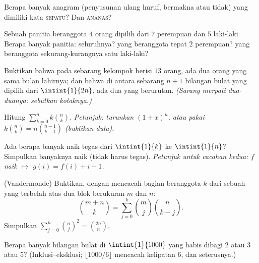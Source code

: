 \begin{exercise}[$\star$]\label{exo:b1:counting:2}
Berapa banyak anagram (penyusunan ulang huruf, bermakna atau tidak)
yang dimiliki kata \textsc{sepatu}? Dan \textsc{ananas}?
\end{exercise}

\begin{exercise}[$\star$]\label{exo:b1:counting:3}
Sebuah panitia beranggota $4$ orang dipilih dari $7$ perempuan dan $5$
laki-laki. Berapa banyak panitia: seluruhnya? yang beranggota tepat $2$
perempuan? yang beranggota sekurang-kurangnya satu laki-laki?
\end{exercise}

\begin{exercise}[$\star$]\label{exo:b1:counting:4}
Buktikan bahwa pada sebarang kelompok berisi $13$ orang, ada dua orang yang sama bulan lahirnya;
dan bahwa di antara sebarang $n + 1$ bilangan bulat yang dipilih dari $\intint{1}{2n}$, ada dua yang berurutan. \emph{(Sarang merpati dua-duanya: sebutkan
kotaknya.)}
\end{exercise}

\begin{exercise}[$\star$]\label{exo:b1:counting:5}
Hitung $\sum_{k=0}^{n} k \binom{n}{k}$. \emph{Petunjuk: turunkan
$(1 + x)^n$, atau pakai $k \binom nk = n \binom{n-1}{k-1}$ (buktikan dulu).}
\end{exercise}

\begin{exercise}[$\star\star$]\label{exo:b1:counting:6}
Ada berapa banyak  naik tegas dari $\intint{1}{k}$ ke $\intint{1}{n}$? Simpulkan banyaknya 
naik (tidak harus tegas). \emph{Petunjuk untuk cacahan kedua:
$f$ naik $\mapsto$ $g(i) = f(i) + i - 1$.}
\end{exercise}

\begin{exercise}[$\star\star$]\label{exo:b1:counting:7}
(Vandermonde) Buktikan, dengan mencacah  bagian beranggota $k$ dari sebuah  yang terbelah atas dua
blok berukuran $m$ dan $n$:
\[
\binom{m+n}{k} = \sum_{j=0}^{k} \binom{m}{j} \binom{n}{k-j} .
\]
Simpulkan $\sum_{j=0}^{n} \binom nj^2 = \binom{2n}{n}$.
\end{exercise}

\begin{exercise}[$\star\star$]\label{exo:b1:counting:8}
Berapa banyak bilangan bulat di $\intint{1}{1000}$ yang habis dibagi
$2$ atau $3$ atau $5$? (Inklusi--eksklusi; $\lfloor 1000/6 \rfloor$
mencacah kelipatan $6$, dan seterusnya.)
\end{exercise}

